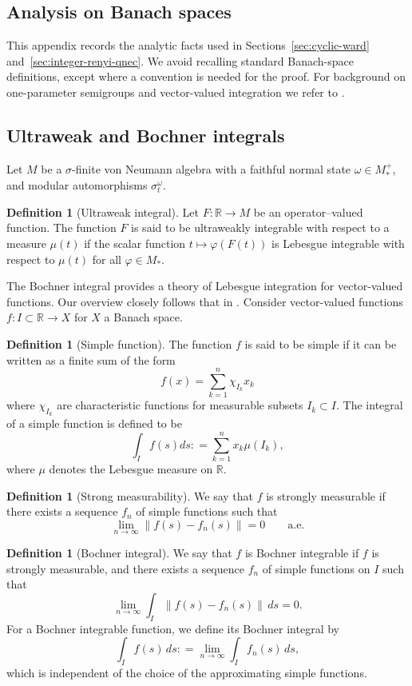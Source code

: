 \documentclass[11pt,a4paper]{article}
\theoremstyle{plain}
\numberwithin{theorem}{section}
\theoremstyle{definition}
\newtheorem{definition}[theorem]{Definition}
\newcommand{\?}{\overset{?}{=}}
\newcommand{\defeq}{\mathrel{\mathop:}=}
\newcommand{\I}{\infty}
\newcommand{\R}{\mathbb{R}}
\begin{document}
\begin{appendix}

\section{Analysis on Banach spaces}\label{appsec:technical}
This appendix records the analytic facts used in Sections~\ref{sec:cyclic-ward}
and~\ref{sec:integer-renyi-qnec}.  We avoid recalling standard Banach-space
definitions, except where a convention is needed for the proof. For background on one-parameter semigroups and vector-valued integration we refer to
\cite{engel.nagel:00:one-parameter,arendt.batty.ea:11:vector-valued}.

\subsection{Ultraweak and Bochner integrals}

Let $M$ be a $\sigma$-finite von Neumann algebra with a faithful normal state $\omega\in M_*^+$, and modular automorphisms $\sigma^{\omega}_t$.
\begin{definition}[Ultraweak integral]\label{def:ultraweak-int}
Let $F: \mathbb R \to M$ be an operator--valued function. The function $F$ is said to be ultraweakly integrable with respect to a measure $\mu(t)$ if the scalar function $t\mapsto \varphi(F(t))$ is Lebesgue integrable with respect to $\mu(t)$ for all $\varphi\in M_*$.
\end{definition}

The Bochner integral provides a theory of Lebesgue integration for vector-valued functions. Our overview closely follows that in \cite{engel.nagel:00:one-parameter}. Consider vector-valued functions $f:I\subset \R\to X$ for $X$ a Banach space.
\begin{definition}[Simple function]
The function $f$ is said to be simple if it can be written as a finite sum of the form
\[
    f(x) = \sum_{k=1}^n\chi_{I_k}x_k
\]
where $\chi_{I_k}$ are characteristic functions for measurable subsets $I_k\subset I.$ The integral of a simple function is defined to be
\[
    \int_I f(s)ds\defeq \sum_{k=1}^nx_k\mu(I_k),
\]
where $\mu$ denotes the Lebesgue measure on $\R$.
\end{definition}
\begin{definition}[Strong measurability]
We say that $f$ is strongly measurable if there exists a sequence $f_n$ of simple functions such that
\[
    \lim_{n\to\I}\|f(s)-f_n(s)\|=0 \qquad\text{a.e.}
\]
\end{definition}
\begin{definition}[Bochner integral]\label{def:Bochner-int}
We say that $f$ is Bochner integrable if $f$ is strongly measurable, and there exists a sequence $f_n$ of simple functions on $I$ such that
\[
    \lim_{n\to\I}\int_I\|f(s)-f_n(s)\|\,ds=0.
\]
For a Bochner integrable function, we define its Bochner integral by
\[
    \int_I f(s)\,ds\defeq \lim_{n\to\I}\int_I f_n(s)\,ds,
\]
which is independent of the choice of the approximating simple functions.
\end{definition}



\end{appendix}
\end{document}
